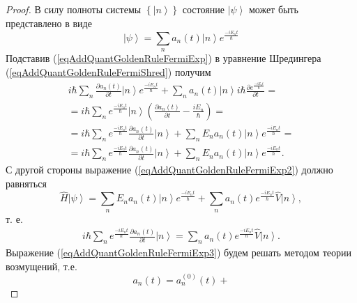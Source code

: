 \begin{proof}
  В силу полноты системы $\left\{\left|n\right>\right\}$ состояние
  $\left|\psi\right>$ может быть представлено в виде
  \begin{equation}
    \left|\psi\right> = \sum_n a_n\left(t\right) \left|n\right>
    e^{\frac{-i E_n t}{\hbar}}
    \label{eqAddQuantGoldenRuleFermiExp}
  \end{equation}
  Подставив (\ref{eqAddQuantGoldenRuleFermiExp}) в уравнение Шредингера
  (\ref{eqAddQuantGoldenRuleFermiShred}) получим
  \begin{eqnarray}
    i \hbar \sum_n \frac{ \partial a_n\left(t\right)}{\partial t }
    \left|n\right> e^{\frac{-i E_n t}{\hbar}} +
    \sum_n a_n\left(t\right) \left|n\right>
    i \hbar \frac{\partial e^{\frac{-i E_n t}{\hbar}}}{ \partial t} =
    \\ \nonumber
    = i \hbar \sum_n  e^{\frac{-i E_n t}{\hbar}} \left|n\right> \left(
    \frac{ \partial a_n\left(t\right)}{\partial t } - \frac{i E_n}{\hbar} 
    \right) =
    \\ \nonumber
    =  i \hbar \sum_n  e^{\frac{-i E_n t}{\hbar}}
    \frac{ \partial a_n\left(t\right)}{\partial t } \left|n\right>+
    \sum_n E_n a_n\left(t\right) \left|n\right>
    e^{\frac{-i E_n t}{\hbar}} =
    \nonumber \\
    =
     i \hbar \sum_n  e^{\frac{-i E_n t}{\hbar}}
     \frac{ \partial a_n\left(t\right)}{\partial t } \left|n\right>+
      \sum_n E_n a_n\left(t\right) \left|n\right>
    e^{\frac{-i E_n t}{\hbar}}.
    \label{eqAddQuantGoldenRuleFermiExp2}
  \end{eqnarray}
  С другой стороны выражение (\ref{eqAddQuantGoldenRuleFermiExp2})
  должно равняться
  \begin{equation}
    \hat{H} \left|\psi\right> =
    \sum_n E_n a_n\left(t\right) \left|n\right>
    e^{\frac{-i E_n t}{\hbar}} +
    \sum_n  a_n\left(t\right) 
    e^{\frac{-i E_n t}{\hbar}} \hat{V} \left|n\right>,
    \nonumber
  \end{equation}
  т. е.
  \begin{eqnarray}
    i \hbar \sum_n  e^{\frac{-i E_n t}{\hbar}}
    \frac{ \partial a_n\left(t\right)}{\partial t } \left|n\right> =
     \sum_n  a_n\left(t\right) 
    e^{\frac{-i E_n t}{\hbar}} \hat{V} \left|n\right>.
    \label{eqAddQuantGoldenRuleFermiExp3}
  \end{eqnarray}
  Выражение (\ref{eqAddQuantGoldenRuleFermiExp3}) будем решать
  методом теории возмущений, т.е.
  \begin{equation}
    a_n\left(t\right) = a_n^{(0)}\left(t\right) +

\end{equation}
\end{proof}
